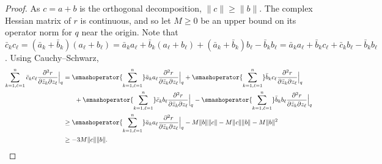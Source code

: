 \documentclass[12pt,openany]{book}
\newcommand{\snorm}[1]{\lVert {#1} \rVert}
\theoremstyle{plain}
\theoremstyle{remark}
\theoremstyle{definition}
\theoremstyle{exercise}
\theoremstyle{example}
\begin{document}
\begin{proof}
As $c = a+b$ is the orthogonal decomposition, $\snorm{c} \geq \snorm{b}$.
The complex Hessian matrix of $r$ is continuous, and so let
$M \geq 0$ be an upper bound on its operator norm for $q$ near the origin.
Note that
$\bar{c}_k c_\ell =
( \bar{a}_k + \bar{b}_k )  (a_\ell + b_\ell)
=
\bar{a}_k a_\ell
+ \bar{b}_k (a_\ell + b_\ell)
+ ( \bar{a}_k + \bar{b}_k ) b_\ell
- \bar{b}_k b_\ell
=
\bar{a}_k a_\ell
+ \bar{b}_k c_\ell
+ \bar{c}_k b_\ell
- \bar{b}_k b_\ell$.
Using Cauchy--Schwarz,
\begin{equation} \label{eq:25boundingchr}
\begin{split}
\sum_{k=1,\ell=1}^n
\bar{c}_k c_\ell \frac{\partial^2 r}{\partial \bar{z}_k \partial z_\ell} \Big|_q
& =
\smashoperator{\sum_{k=1,\ell=1}^n}
\bar{a}_k a_\ell \frac{\partial^2 r}{\partial \bar{z}_k \partial z_\ell} \Big|_q
+
\smashoperator{\sum_{k=1,\ell=1}^n}
\bar{b}_k c_\ell \frac{\partial^2 r}{\partial \bar{z}_k \partial z_\ell} \Big|_q
\\
& \phantom{=} \quad
+
\smashoperator{\sum_{k=1,\ell=1}^n}
\bar{c}_k  b_\ell \frac{\partial^2 r}{\partial \bar{z}_k \partial z_\ell} \Big|_q
-
\smashoperator{\sum_{k=1,\ell=1}^n}
\bar{b}_k  b_\ell \frac{\partial^2 r}{\partial \bar{z}_k \partial z_\ell} \Big|_q
\\
& \geq
\smashoperator{\sum_{k=1,\ell=1}^n}
\bar{a}_k a_\ell \frac{\partial^2 r}{\partial \bar{z}_k \partial z_\ell} \Big|_q
-
M\snorm{b}\snorm{c}
-
M\snorm{c}\snorm{b}
-
M\snorm{b}^2
\\
& \geq
-
3 M\snorm{c}\snorm{b} .
\end{split}
\end{equation}


\end{proof}
\end{document}

